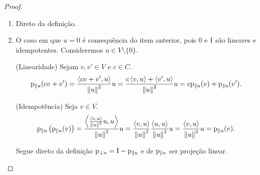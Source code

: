 \begin{proof}
	\begin{enumerate}
	\item Direto da definição.

	\item O caso em que $u = 0$ é consequência do item anterior, pois $0$ e $\mathrm{I}$ são lineares e idempotentes. Consideremos $u \in V \setminus \{0\}$.

	(Linearidade) Sejam $v,v' \in V$ e $c \in C$.
	\begin{equation*}
	\mathrm{p}_{\parallel u}(cv+v') = \frac{\left\langle{cv+v'},{u}\right\rangle}{\left\Vert{u}\right\Vert^2}u = \frac{c\left\langle{v},{u}\right\rangle + \left\langle{v'},{u}\right\rangle}{\left\Vert{u}\right\Vert^2}u = c\mathrm{p}_{\parallel u}(v) + \mathrm{p}_{\parallel u}(v').
	\end{equation*}

(Idempotência) Seja $v \in V$.
		\begin{equation*}
		\mathrm{p}_{\parallel u}\left( \mathrm{p}_{\parallel u}(v) \right) = \frac{\left\langle{\frac{\left\langle{v},{u}\right\rangle}{\left\Vert{u}\right\Vert^2}u},{u}\right\rangle}{\left\Vert{u}\right\Vert^2}u = \frac{\left\langle{v},{u}\right\rangle}{\left\Vert{u}\right\Vert^2}\frac{\left\langle{u},{u}\right\rangle}{\left\Vert{u}\right\Vert^2}u = \frac{\left\langle{v},{u}\right\rangle}{\left\Vert{u}\right\Vert^2}u = \mathrm{p}_{\parallel u}(v).
		\end{equation*}

	Segue direto da definição $\mathrm{p}_{\perp u} = \mathrm{I}-\mathrm{p}_{\parallel u}$ e de $\mathrm{p}_{\parallel u}$ ser projeção linear.

\begin{comment}
(Linearidade) Sejam $v,v' \in V$ e $c \in C$.
	\begin{equation*}
	\proj_{\perp u}(cv+v') = cv+v' - \proj_{\parallel u}(cv+v') = cv+v' - c\proj_{\parallel u}(v) + \proj_{\parallel u}(v') = c\proj_{\perp u}(v) + \proj_{\perp u}(v').
	\end{equation*}

(Idempotência) Seja $v \in V$.
	\begin{align*}
	\proj_{\perp u}\left( \proj_{\perp u}(v) \right) &= v - \proj_{\parallel u}(v) - \proj_{\parallel u}\left( v - \proj_{\parallel u}(v) \right) \\
		&= v - \proj_{\parallel u}(v) - \proj_{\parallel u}(v) + \proj_{\parallel u}\left( \proj_{\parallel u}(v) \right) \\
		&= v - \proj_{\parallel u}(v) - \proj_{\parallel u}(v) + \proj_{\parallel u}(v) \\
		&= v - \proj_{\parallel u}(v) \\
		&= \proj_{\perp u}(v).
	\end{align*}


\end{comment}
\end{enumerate}
\end{proof}
